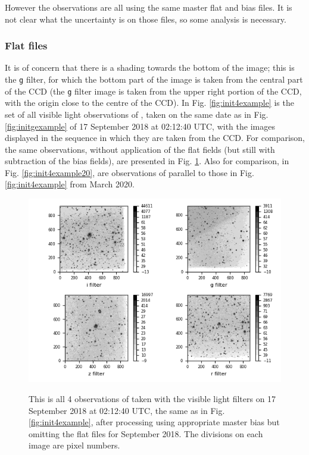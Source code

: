 However the observations are all using the same master flat and bias files. It
is not clear what the uncertainty is on those files, so some analysis is
necessary.

\subsubsection{Flat files}
\protect\label{section:issueflatfiles}

It is of concern that there is a shading towards the bottom of the image; this
is the \texttt{g} filter, for which the bottom part of the image is taken from
the central part of the CCD (the \texttt{g} filter image is taken from the
upper right portion of the CCD, with the origin close to the centre of the CCD).
In Fig. \ref{fig:init4example} is the set of all visible light observations of
\prox, taken on the same date as in Fig. \ref{fig:initgexample} of 17 September 2018 at
02:12:40 UTC, with the images displayed in the sequence in which they are taken
from the CCD. For comparison, the same observations, without application of the
flat fields (but still with subtraction of the bias fields), are presented in
Fig. \ref{fig:init4exnoflat}. Also for comparison, in Fig.
\ref{fig:init4example20}, are observations of {\prox} parallel to those in Fig.
\ref{fig:init4example} from March 2020.

\begin{figure}[!htbp]
\begin{center}
\includegraphics[scale=1]{images/init4exnoflat.png}
\end{center}   
\caption{This is all 4 observations of {\prox} taken with the visible light
filters on 17 September 2018 at 02:12:40 UTC, the same as in Fig.
\ref{fig:init4example}, after processing using appropriate master bias but
omitting the flat files for September 2018. The divisions on each image are pixel numbers.}
\protect\label{fig:init4exnoflat}
\end{figure}


